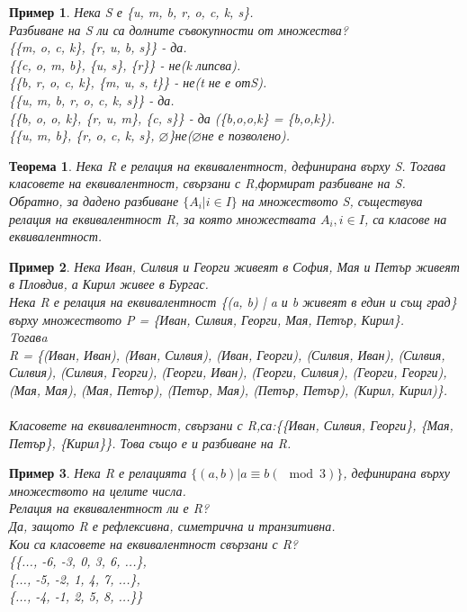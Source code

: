 \documentclass[fleqn, 12pt]{article}
\newtheorem{example}{Пример}[subsection]
\newtheorem{theorem}{Теорема}[subsection]
\begin{document}
\begin{example}
Нека S е \{u, m, b, r, o, c, k, s\}.\\
Разбиване на S ли са долните съвокупности от множества?\\
\{\{m, o, c, k\}, \{r, u, b, s\}\} - да.\\
\{\{c, o, m, b\}, \{u, s\}, \{r\}\} - не(k липсва).\\
\{\{b, r, o, c, k\}, \{m, u, s, t\}\} - не(t не е отS).\\
\{\{u, m, b, r, o, c, k, s\}\} - да.\\
\{\{b, o, o, k\}, \{r, u, m\}, \{c, s\}\} - да (\{b,o,o,k\} = \{b,o,k\}).\\
\{\{u, m, b\}, \{r, o, c, k, s\}, $\varnothing$\}не($\varnothing$не е позволено).
\end{example}

\begin{theorem}
Нека R е релация на еквивалентност, дефинирана върху S. Тогава класовете на еквивалентност, свързани с R,формират разбиване на S.\\
Обратно, за дадено разбиване $\{A_i | i \in I\}$ на множеството S, съществува релация на еквивалентност R, за която множествата $A_i, i \in I$, са класове на еквивалентност.
\end{theorem}

\begin{example}
Нека Иван, Силвия и Георги живеят в  София, Мая и Петър  живеят в Пловдив, а Кирил живее в Бургас. \\
Нека R е релация на еквивалентност \{(a, b) | a и b живеят в един и същ град\} върху множеството P = \{Иван, Силвия,   Георги, Мая,  Петър, Кирил\}.\\
Tогавa \\
R = \{(Иван, Иван),\;
(Иван, Силвия),\;
(Иван, Георги),\;
(Силвия, Иван),\;
(Силвия, Силвия),\;
(Силвия, Георги),\;
(Георги, Иван),\;
(Георги, Силвия),\;
(Георги, Георги),\;
(Мая, Мая), \;
(Мая, Петър), \;
(Петър, Мая),\;
(Петър, Петър),\;
(Кирил, Кирил)\}.\\
\\
Класовете на еквивалентност, свързани с R,са:\{\{Иван, Силвия, Георги\},\; \{Мая,  Петър\},\; \{Кирил\}\}. Това също е и разбиване на R.

\end{example}

\begin{example}
Нека R е релацията $\{(a, b) | a \equiv b (\mod 3)\}$, дефинирана върху множеството на целите числа.\\
Релация на еквивалентност ли е R?\\
Да, защото R е рефлексивна, симетрична и транзитивна. \\
Кои са класовете на еквивалентност свързани с R?\\
\{\{..., -6,   -3, 0, 3, 6, ...\},\\
\{..., -5,   -2, 1, 4, 7, ...\},\\
\{..., -4,   -1, 2, 5, 8, ...\}\}
\end{example}
\end{document}
